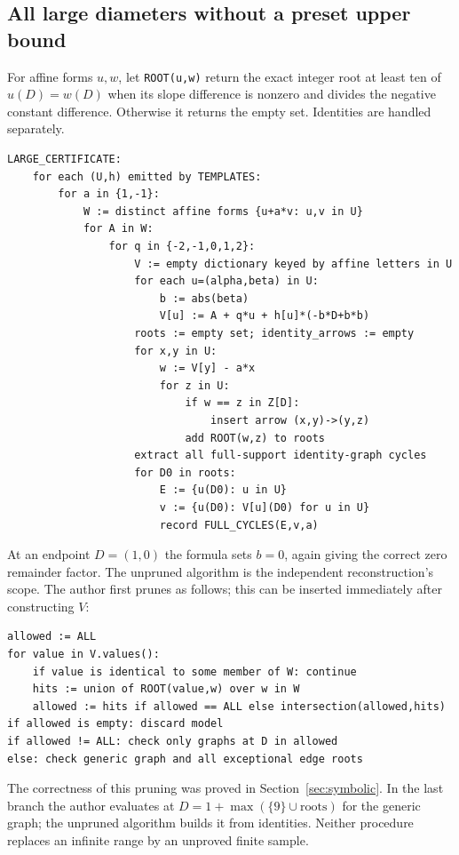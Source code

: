 \subsection{All large diameters without a preset upper bound}
For affine forms $u,w$, let \texttt{ROOT(u,w)} return the exact
integer root at least ten of $u(D)=w(D)$ when its slope difference
is nonzero and divides the negative constant difference. Otherwise
it returns the empty set. Identities are handled separately.
\begin{Verbatim}[fontsize=\small]
LARGE_CERTIFICATE:
    for each (U,h) emitted by TEMPLATES:
        for a in {1,-1}:
            W := distinct affine forms {u+a*v: u,v in U}
            for A in W:
                for q in {-2,-1,0,1,2}:
                    V := empty dictionary keyed by affine letters in U
                    for each u=(alpha,beta) in U:
                        b := abs(beta)
                        V[u] := A + q*u + h[u]*(-b*D+b*b)
                    roots := empty set; identity_arrows := empty
                    for x,y in U:
                        w := V[y] - a*x
                        for z in U:
                            if w == z in Z[D]:
                                insert arrow (x,y)->(y,z)
                            add ROOT(w,z) to roots
                    extract all full-support identity-graph cycles
                    for D0 in roots:
                        E := {u(D0): u in U}
                        v := {u(D0): V[u](D0) for u in U}
                        record FULL_CYCLES(E,v,a)
\end{Verbatim}
At an endpoint $D=(1,0)$ the formula sets $b=0$, again giving the
correct zero remainder factor. The unpruned algorithm is the
independent reconstruction's scope. The author first prunes as
follows; this can be inserted immediately after constructing $V$:
\begin{Verbatim}[fontsize=\small]
allowed := ALL
for value in V.values():
    if value is identical to some member of W: continue
    hits := union of ROOT(value,w) over w in W
    allowed := hits if allowed == ALL else intersection(allowed,hits)
if allowed is empty: discard model
if allowed != ALL: check only graphs at D in allowed
else: check generic graph and all exceptional edge roots
\end{Verbatim}
The correctness of this pruning was proved in
Section~\ref{sec:symbolic}. In the last branch the author evaluates
at $D=1+\max(\{9\}\cup\mathrm{roots})$ for the generic graph;
the unpruned algorithm builds it from identities. Neither procedure
replaces an infinite range by an unproved finite sample.

